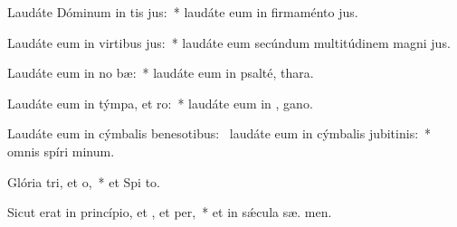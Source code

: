 \item Laudáte Dóminum in tis jus:~* laudáte eum in firmaménto  jus.
\item Laudáte eum in virtibus jus:~* laudáte eum secúndum multitúdinem magni jus.
\item Laudáte eum in no bæ:~* laudáte eum in psalté,  thara.
\item Laudáte eum in týmpa, et ro:~* laudáte eum in ,  gano.
\item Laudáte eum in cýmbalis benesotibus:~\pscross{} laudáte eum in cýmbalis jubitinis:~* omnis spíri  minum.
\item Glória tri, et o,~* et Spi to.
\item Sicut erat in princípio, et , et per,~* et in sǽcula sæ. men.
